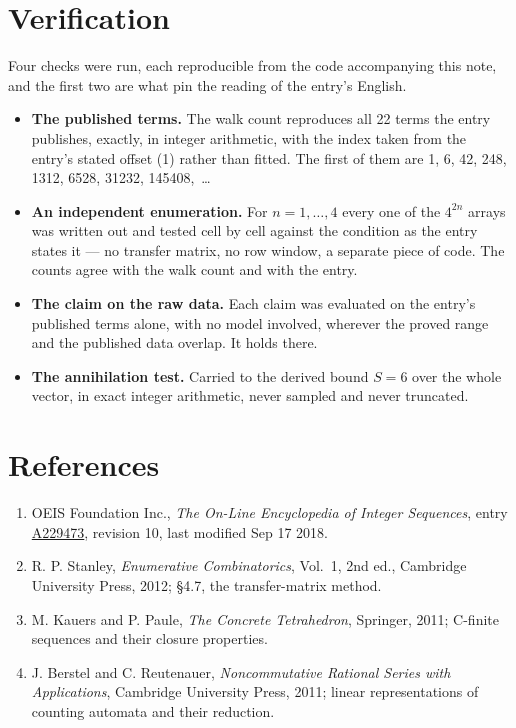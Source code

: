 \documentclass[11pt]{article}
\theoremstyle{definition}
\begin{document}
\section{Verification}

Four checks were run, each reproducible from the code accompanying this note, and the first two are what pin the reading of the entry's English.

\begin{itemize}

\item {\bfseries The published terms.} The walk count reproduces all 22 terms the entry publishes, exactly, in integer arithmetic, with the index taken from the entry's stated offset (1) rather than fitted. The first of them are 1, 6, 42, 248, 1312, 6528, 31232, 145408,~\dots

\item {\bfseries An independent enumeration.} For $n = 1,\dots,4$ every one of the $4^{2n}$ arrays was written out and tested cell by cell against the condition as the entry states it --- no transfer matrix, no row window, a separate piece of code. The counts agree with the walk count and with the entry.

\item {\bfseries The claim on the raw data.} Each claim was evaluated on the entry's published terms alone, with no model involved, wherever the proved range and the published data overlap. It holds there.

\item {\bfseries The annihilation test.} Carried to the derived bound $S = 6$ over the whole vector, in exact integer arithmetic, never sampled and never truncated.

\end{itemize}

\section{References}

\begin{enumerate}

\item OEIS Foundation Inc., \emph{The On-Line Encyclopedia of Integer Sequences}, entry \href{https://oeis.org/A229473}{A229473}, revision 10, last modified Sep 17 2018.

\item R. P. Stanley, \emph{Enumerative Combinatorics}, Vol.~1, 2nd ed., Cambridge University Press, 2012; \S4.7, the transfer-matrix method.

\item M. Kauers and P. Paule, \emph{The Concrete Tetrahedron}, Springer, 2011; C-finite sequences and their closure properties.

\item J. Berstel and C. Reutenauer, \emph{Noncommutative Rational Series with Applications}, Cambridge University Press, 2011; linear representations of counting automata and their reduction.

\end{enumerate}
\end{document}
